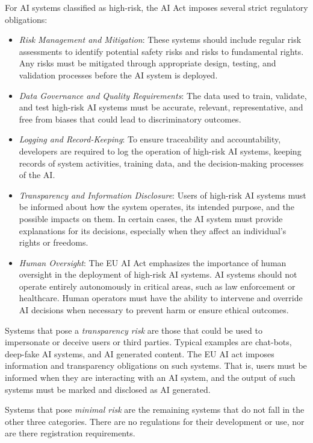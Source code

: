 For AI systems classified as high-risk, the AI Act imposes several strict regulatory obligations:
\begin{itemize}
  \item \emph{Risk Management and Mitigation}: These systems should include regular risk assessments to identify potential safety risks and risks to fundamental rights. Any risks must be mitigated through appropriate design, testing, and validation processes before the AI system is deployed.

  \item \emph{Data Governance and Quality Requirements}: The data used to train, validate, and test high-risk AI systems must be accurate, relevant, representative, and free from biases that could lead to discriminatory outcomes.

  \item \emph{Logging and Record-Keeping}: To ensure traceability and accountability, developers are required to log the operation of high-risk AI systems, keeping records of system activities, training data, and the decision-making processes of the AI. 

  \item \emph{Transparency and Information Disclosure}: Users of high-risk AI systems must be informed about how the system operates, its intended purpose, and the possible impacts on them. In certain cases, the AI system must provide explanations for its decisions, especially when they affect an individual's rights or freedoms.

  \item \emph{Human Oversight}: The EU AI Act emphasizes the importance of human oversight in the deployment of high-risk AI systems. AI systems should not operate entirely autonomously in critical areas, such as law enforcement or healthcare. Human operators must have the ability to intervene and override AI decisions when necessary to prevent harm or ensure ethical outcomes.
\end{itemize}

Systems that pose a \emph{transparency risk} are those that could be used to impersonate or deceive users or third parties. Typical examples are chat-bots, deep-fake AI systems, and AI generated content. The EU AI act imposes information and transparency obligations on such systems. That is, users must be informed when they are interacting with an AI system, and the output of such systems must be marked and disclosed as AI generated. 

Systems that pose \emph{minimal risk} are the remaining systems that do not fall in the other three categories. There are no regulations for their development or use, nor are there registration requirements. 

